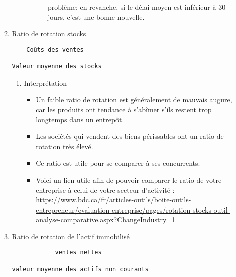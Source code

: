 \documentclass[11pt]{article}
\begin{document}
\begin{enumerate}
\begin{enumerate}
\begin{enumerate}
\begin{itemize}
\begin{itemize}
problème; en revanche, si le délai moyen est inférieur à 30 jours, c’est une bonne
nouvelle.
\end{itemize}
\end{itemize}
\end{enumerate}
\item Ratio de rotation stocks
\label{sec:org00c3386}
\begin{verbatim}
    Coûts des ventes
-------------------------
Valeur moyenne des stocks
\end{verbatim}
\begin{enumerate}
\item Interprétation
\label{sec:org1ab4672}
\begin{itemize}
\item Un faible ratio de rotation est généralement de mauvais augure, car les produits ont
tendance à s'abîmer s'ils restent trop longtemps dans un entrepôt.
\item Les sociétés qui vendent des biens périssables ont un ratio de rotation très élevé.
\item Ce ratio est utile pour se comparer à ses concurrents.
\item Voici un lien utile afin de pouvoir comparer le ratio de votre entreprise à celui de votre
secteur d’activité :
\url{https://www.bdc.ca/fr/articles-outils/boite-outils-entrepreneur/evaluation-entreprise/pages/rotation-stocks-outil-analyse-comparative.aspx?ChangeIndustry=1}
\end{itemize}
\end{enumerate}
\item Ratio de rotation de l'actif immobilisé
\label{sec:org9866e1e}
\begin{verbatim}
            ventes nettes
--------------------------------------
valeur moyenne des actifs non courants


\end{verbatim}
\end{enumerate}
\end{enumerate}
\end{document}
